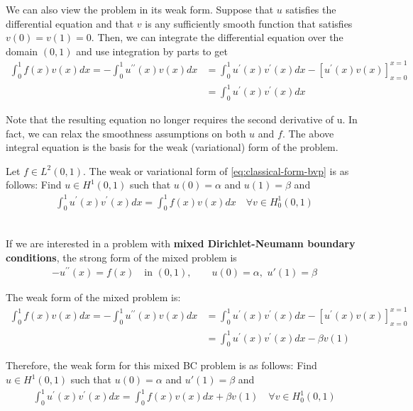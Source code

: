 \documentclass[../main.tex]{subfiles}
\begin{document}
We can also view the problem in its weak form. Suppose that $u$ satisfies the differential equation and that $v$ is any sufficiently smooth function that satisfies $v(0) = v(1) = 0$. Then, we can integrate the differential equation over the domain $(0,1)$ and use integration by parts to get
\begin{align*}
    \int_0^1 f(x)v(x) dx = -\int_0^1 u^{\prime\prime}(x)v(x) dx  &= \int_0^1 u^{\prime}(x)v^{\prime}(x) dx - [u^{\prime}(x)v(x)]_{x = 0}^{x = 1} \\
    &= \int_0^1 u^{\prime}(x)v^{\prime}(x) dx
\end{align*}

Note that the resulting equation no longer requires the second derivative of u. In fact, we can relax the smoothness assumptions on both $u$ and $f$. The above integral equation is the basis for the weak (variational) form of the problem.

\begin{defn}
    Let $f \in L^2(0,1)$. The weak or variational form of \eqref{eq:classical-form-bvp} is as follows: Find  $u \in H^1(0,1)$ such that $u(0) = \alpha$ and $u(1) = \beta$ and
    \begin{align}
        \int_0^1 u^{\prime}(x)v^{\prime}(x) dx = \int_0^1 f(x)v(x) dx \quad \forall v \in H^1_0(0,1)
        \label{eq:weak-form-bvp}
    \end{align}
\end{defn}

\ \\
If we are interested in a problem with \textbf{mixed Dirichlet-Neumann boundary conditions}, the strong form of the mixed problem is 
\begin{align}
    -u^{\prime\prime}(x) = f(x) \quad \text{in } (0,1), \quad\quad u(0) = \alpha, \,\, u'(1) = \beta \label{eq:classical-form-bvp-mixed}
\end{align}

\noindent The weak form of the mixed problem is:
\begin{align*}
    \int_0^1 f(x)v(x) dx = -\int_0^1 u^{\prime\prime}(x)v(x) dx  &= \int_0^1 u^{\prime}(x)v^{\prime}(x) dx - [u^{\prime}(x)v(x)]_{x = 0}^{x = 1} \\
    &= \int_0^1 u^{\prime}(x)v^{\prime}(x) dx - \beta v(1)
\end{align*}

\noindent Therefore, the weak form for this mixed BC problem is as follows: Find $u \in H^1(0,1)$ such that $u(0) = \alpha$ and $u'(1) = \beta$ and
\begin{align}
    \int_0^1 u^{\prime}(x)v^{\prime}(x) dx = \int_0^1 f(x)v(x) dx + \beta v(1) \quad \forall v \in H^1_0(0,1)
    \label{eq:weak-form-bvp-mixed}
\end{align}
\end{document}
